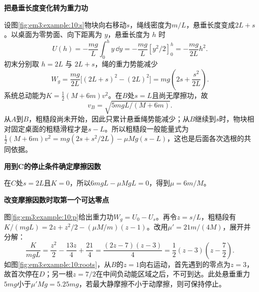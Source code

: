 \begin{solution}\textbf{把悬垂长度变化转为重力功}\par\nobreak
设图\ref{fig:em3:example:10:s}物块向右移动$s$，绳线密度为$m/L$，悬垂长度变成$2L+s$。以桌面为零势面、向下距离为 $y$，悬垂长度为 $h$ 时
\[
U(h)=-\frac{mg}{L}\int_0^h y\,\dd y
=-\frac{mg}{L}[y^2/2]_0^h
=-\frac{mg}{2L}h^2.
\]
初末分别取 $h=2L$ 与 $2L+s$，绳的重力势能减少
\[W_g=\frac{mg}{2L}\bigl[(2L+s)^2-(2L)^2\bigr]=mg\left(2s+\frac{s^2}{2L}\right).\]
系统总动能为$K=\tfrac12(M+6m)v^2$。在$B$处$s=L$且尚无摩擦功，故
\[\boxed{v_B=\sqrt{5mgL/(M+6m)}}.\]
从$A$到$B$，粗糙段尚未开始，因此只累计悬垂绳势能减少；从$B$继续到$s$时，物块相对固定桌面的粗糙滑程才是$s-L$。所以粗糙段一般能量式为$\tfrac12(M+6m)v^2=mg(2s+s^2/2L)-\mu Mg(s-L)$，这也是后面各次选根的共同依据。



\par\medskip{}\noindent\textbf{用到C的停止条件确定摩擦因数}\par\nobreak
在$C$处$s=2L$且$K=0$，所以$6mgL-\mu MgL=0$，得到$\boxed{\mu=6m/M}$。



\par\medskip{}\noindent\textbf{改变摩擦因数时取第一个可达零点}\par\nobreak
图\ref{fig:em3:example:10:p}给出重力功$W_g=U_0-U_s$。再令$z=s/L$，粗糙段有$K/(mgL)=2z+z^2/2-(\mu M/m)(z-1)$。改用$\mu'=21m/(4M)$，展开并分解：
\[
\frac{K}{mgL}=\frac{z^2}{2}-\frac{13z}{4}+\frac{21}{4}
=\frac{(2z-7)(z-3)}4
=\frac12(z-3)\left(z-\frac72\right).
\]
如图\ref{fig:em3:example:10:roots}，从$B$的$z=1$向右运动，首先遇到的零点为$z=3$，故首次停在$\boxed{D}$；另一根$z=7/2$在中间负动能区域之后，不可到达。此处悬垂重力$5mg$小于$\mu'Mg=5.25mg$，若最大静摩擦不小于动摩擦，则可保持停止。


\end{solution}
